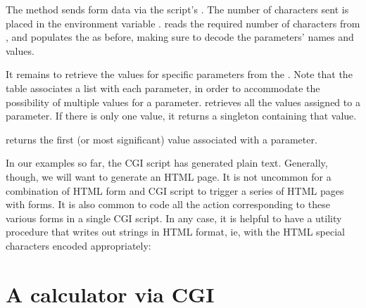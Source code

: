 {{{{{{{\n The  method sends form data via the script's
.  The number of characters sent is placed in
the environment variable .
 reads the required
number of characters from , and populates the
 as before, making sure to decode
the parameters' names and values.

It remains to retrieve the values for specific
parameters from the .  Note that
the table associates a list with each parameter, in
order to accommodate the possibility of multiple values
for a parameter.   retrieves all the
values assigned to a parameter.  If there is only one
value, it returns a singleton containing that value.


\n {} returns the first (or most
  significant) value associated with a parameter.


\n In our examples so far, the CGI script has generated
plain text.  Generally, though, we will want to
generate an HTML page.  It is not uncommon for a
combination of HTML form and CGI script to trigger a
series of HTML pages with forms.  It is also common to
code all the action corresponding to these various
forms in a single CGI script.  In any case, it is
helpful to have a utility procedure that writes out strings
in HTML format, ie, with the HTML special characters
encoded appropriately:


\section{A calculator via CGI}

}}}}}}}
